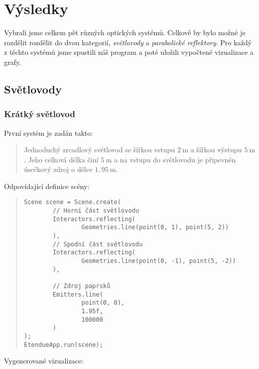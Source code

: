 \chapter{Výsledky}


Vybrali jsme celkem pět různých optických systémů. Celkově by bylo možné je rozdělit rozdělit do dvou kategorií, \emph{světlovody} a \emph{parabolické reflektory}. Pro každý z těchto systémů jsme spustili náš program a poté uložili vypočtené vizualizace a grafy.


\section{Světlovody}
\label{sec:svetlovody}

\subsection{Krátký světlovod}

První systém je zadán takto:

\begin{quote}
    Jednoduchý zrcadlový světlovod se šířkou vstupu $2\ \mathrm{m}$ a šířkou výstupu $5\ \mathrm{m}$. Jeho celková délka činí $5\ \mathrm{m}$ a na vstupu do světlovodu je připevněn úsečkový zdroj o délce $1,95\ \mathrm{m}$.
\end{quote}

Odpovídající definice scény:

\begin{minipage}{\textwidth}\begin{quote}\begin{lstlisting}
Scene scene = Scene.create(
        // Horní část světlovodu
        Interactors.reflecting(
                Geometries.line(point(0, 1), point(5, 2))
        ),
        // Spodní část světlovodu
        Interactors.reflecting(
                Geometries.line(point(0, -1), point(5, -2))
        ),

        // Zdroj paprsků
        Emitters.line(
                point(0, 0),
                1.95f,
                100000
        )
);
EtendueApp.run(scene);
\end{lstlisting}\end{quote}\end{minipage}

Vygenerované vizualizace:



